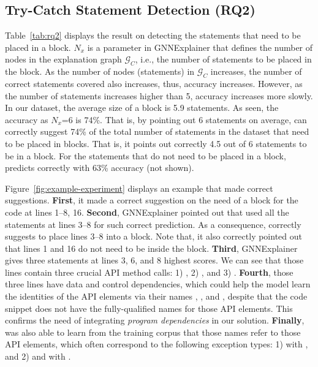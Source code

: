 \subsection{Try-Catch Statement Detection (RQ2)}
\label{sec:rq2}

Table~\ref{tab:rq2} displays the result on detecting the statements
that need to be placed in a  block. $N_x$ is a parameter
in GNNExplainer that defines the number of nodes in the explanation
graph $\mathcal{G}_C$, i.e., the number of statements to be placed in the
 block.
%
As the number of nodes (statements) in $\mathcal{G}_C$ increases, the
number of correct statements covered also increases, thus, accuracy
increases. However, as the number of statements increases higher than
5, accuracy increases more slowly. In our dataset, the average size of
a  block is 5.9 statements. As seen, the accuracy as
$N_x$=6 is 74\%. That is, by pointing out 6 statements on average,
{\tool} can correctly suggest 74\% of the total number of statements
in the dataset that need to be placed in 
blocks. That is, it points out correctly 4.5 out of 6 statements to be
in a  block. For the statements that do not need to be
placed in a  block, {\tool} predicts correctly with
63\% accuracy (not shown).



\vspace{2pt}
 Figure~\ref{fig:example-experiment} displays
an example that {\tool} made correct suggestions. {\bf First}, it made
a correct suggestion on the need of a  block for the
code at lines 1--8, 16.  {\bf Second}, GNNExplainer pointed out that
{\xblock} used all the statements at lines 3--8 for such correct
prediction. As a consequence, {\tool} correctly suggests to place
lines 3--8 into a  block. Note that, it also correctly
pointed out that lines 1 and 16 do not need to be inside the
 block.  {\bf Third}, GNNExplainer gives three
statements at lines 3, 6, and 8 highest scores. We can see that those
lines contain three crucial API method calls: 1)
, 2) , and 3) . {\bf
  Fourth}, those three lines have data and control dependencies, which
could help the model learn the identities of the API elements via
their names , , and ,
despite that the code snippet does not have the fully-qualified names
for those API elements. This confirms the need of integrating {\em program
  dependencies} in our solution. {\bf Finally}, {\tool} was also able
to learn from the training corpus that those names refer to those API
elements, which often correspond to the following exception types: 1)
 with , and 2)
 and  with
.



